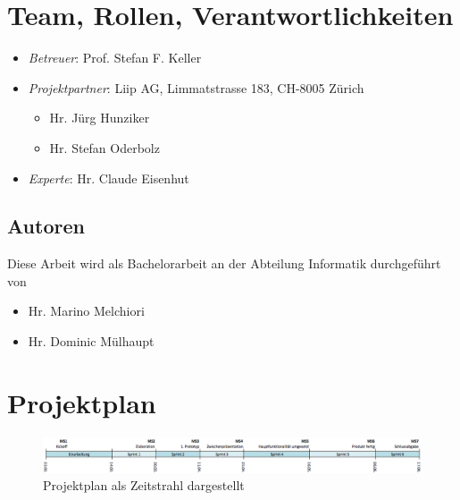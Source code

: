 \section{Team, Rollen, Verantwortlichkeiten}
\label{pm-rollen}
\begin{itemize}
	\item \textit{Betreuer}: Prof. Stefan F. Keller
	\item \textit{Projektpartner}: Liip AG, Limmatstrasse 183, CH-8005 Zürich
	\begin{itemize}
		\item Hr. Jürg Hunziker
		\item Hr. Stefan Oderbolz
	\end{itemize}
	\item \textit{Experte}: Hr. Claude Eisenhut
\end{itemize}

\subsection*{Autoren}
Diese Arbeit wird als Bachelorarbeit an der Abteilung Informatik durchgeführt von
\begin{itemize}
	\item Hr. Marino Melchiori
	\item Hr. Dominic Mülhaupt
\end{itemize}




\section{Projektplan}

\begin{figure}[H]
	\centering
	\includegraphics[width=\textwidth]{images/projektmanagement/zeitstrahl.png}
	\caption{Projektplan als Zeitstrahl dargestellt}
	\label{image-project-plan-timeline}
\end{figure}

